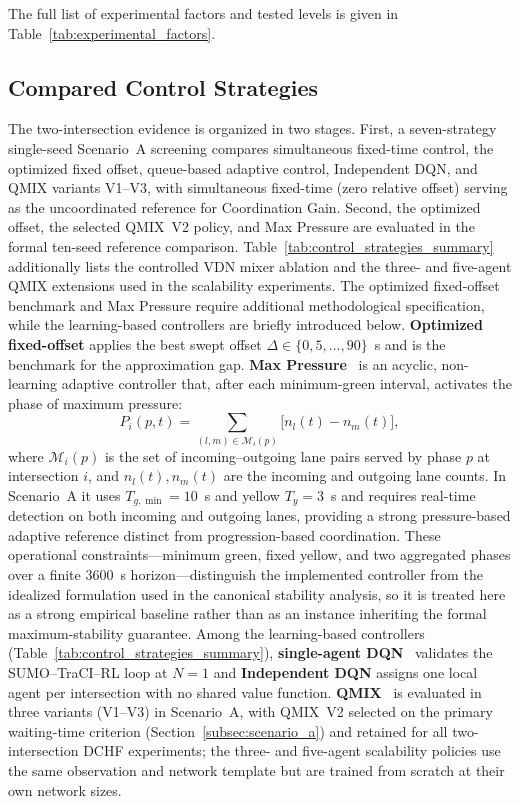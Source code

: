 \documentclass[review,12pt]{elsarticle}
\begin{document}
The full list of experimental factors and tested levels is given in Table~\ref{tab:experimental_factors}.

\FloatBarrier
\subsection{Compared Control Strategies}
\label{subsec:control_strategies}
The two-intersection evidence is organized in two stages. First, a seven-strategy single-seed Scenario~A screening compares simultaneous fixed-time control, the optimized fixed offset, queue-based adaptive control, Independent DQN, and QMIX variants V1--V3, with simultaneous fixed-time (zero relative offset) serving as the uncoordinated reference for Coordination Gain. Second, the optimized offset, the selected QMIX~V2 policy, and Max Pressure are evaluated in the formal ten-seed reference comparison. Table~\ref{tab:control_strategies_summary} additionally lists the controlled VDN mixer ablation and the three- and five-agent QMIX extensions used in the scalability experiments. The optimized fixed-offset benchmark and Max Pressure require additional methodological specification, while the learning-based controllers are briefly introduced below. \textbf{Optimized fixed-offset} applies the best swept offset $\Delta\in\{0,5,\ldots,90\}$~s and is the benchmark for the approximation gap. \textbf{Max Pressure}~\cite{varaiya2013max,ducrocq2023deep} is an acyclic, non-learning adaptive controller that, after each minimum-green interval, activates the phase of maximum pressure:
\begin{equation}
P_i(p,t)=\sum_{(l,m)\in\mathcal{M}_i(p)}\bigl[n_l(t)-n_m(t)\bigr],
\label{eq:max_pressure}
\end{equation}
where $\mathcal{M}_i(p)$ is the set of incoming--outgoing lane pairs served by phase $p$ at intersection $i$, and $n_l(t),n_m(t)$ are the incoming and outgoing lane counts. In Scenario~A it uses $T_{g,\min}=10$~s and yellow $T_y=3$~s and requires real-time detection on both incoming and outgoing lanes, providing a strong pressure-based adaptive reference distinct from progression-based coordination. These operational constraints---minimum green, fixed yellow, and two aggregated phases over a finite $3600$~s horizon---distinguish the implemented controller from the idealized formulation used in the canonical stability analysis, so it is treated here as a strong empirical baseline rather than as an instance inheriting the formal maximum-stability guarantee. Among the learning-based controllers (Table~\ref{tab:control_strategies_summary}), \textbf{single-agent DQN}~\cite{Mnih2015} validates the SUMO--TraCI--RL loop at $N=1$ and \textbf{Independent DQN} assigns one local agent per intersection with no shared value function. \textbf{QMIX}~\cite{Rashid2018} is evaluated in three variants (V1--V3) in Scenario~A, with QMIX~V2 selected on the primary waiting-time criterion (Section~\ref{subsec:scenario_a}) and retained for all two-intersection DCHF experiments; the three- and five-agent scalability policies use the same observation and network template but are trained from scratch at their own network sizes.
\end{document}
